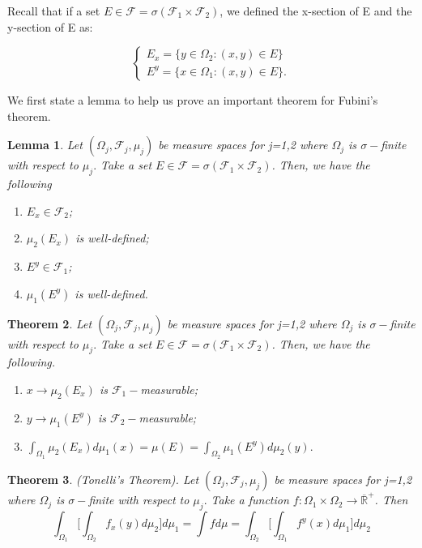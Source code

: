 \documentclass[twoside]{article}
\newcounter{lecnum}
\newtheorem{theorem}{Theorem}[lecnum]
\newtheorem{lemma}[theorem]{Lemma}
\newcommand{\sigmalgebra}{\mathcal{F}}
\newcommand{\positiveextendedreal}{\overline{\mathbb{R}}^+}
\begin{document}
Recall that if a set $E \in \sigmalgebra = \sigma(\sigmalgebra_1 \times \sigmalgebra_2)$, we defined the x-section of E and the y-section of E as: 

$$
\begin{cases}
E_x = \{y \in \Omega_2: (x,y) \in E\}\\
E^y = \{x \in \Omega_1: (x,y) \in E\}. 
\end{cases}
$$

We first state a lemma to help us prove an important theorem for Fubini's theorem.
\begin{lemma}Let $(\Omega_j, \sigmalgebra_j, \mu_j)$ be measure spaces for j=1,2 where $\Omega_j$ is $\sigma-$finite with respect to $\mu_j.$ Take a set $E \in \sigmalgebra = \sigma(\sigmalgebra_1 \times \sigmalgebra_2)$. Then, we have the following 
\begin{enumerate}
\item $E_x \in \sigmalgebra_2$;
\item $\mu_2(E_x)$ is well-defined;
\item $E^y \in \sigmalgebra_1$;
\item $\mu_1(E^y)$ is well-defined.
\end{enumerate}
\end{lemma}

\begin{theorem}Let $(\Omega_j, \sigmalgebra_j, \mu_j)$ be measure spaces for j=1,2 where $\Omega_j$ is $\sigma-$finite with respect to $\mu_j.$ Take a set $E \in \sigmalgebra = \sigma(\sigmalgebra_1 \times \sigmalgebra_2)$. Then, we have the following.
\begin{enumerate}
\item $x \rightarrow \mu_2(E_x)$ is $\sigmalgebra_1-$measurable;
\item $y \rightarrow \mu_1(E^y)$ is $\sigmalgebra_2-$measurable;
\item $\int_{\Omega_{1}} \mu_2(E_x)d\mu_1(x) = \mu(E) = \int_{\Omega_{2}} \mu_1(E^y)d\mu_2(y).$
\end{enumerate}
\end{theorem}


\begin{theorem}(Tonelli's Theorem). Let $(\Omega_j, \sigmalgebra_j, \mu_j)$ be measure spaces for j=1,2 where $\Omega_j$ is $\sigma-$finite with respect to $\mu_j.$ Take a function $f: \Omega_1 \times \Omega_2 \rightarrow \positiveextendedreal$. Then 
$$
\int_{\Omega_{1}}\bigg[\int_{\Omega_{2}}f_x(y)d\mu_2 \bigg]d\mu_1 = \int fd\mu = \int_{\Omega_{2}}\bigg[\int_{\Omega_{1}}f^y(x)d\mu_1 \bigg]d\mu_2
$$
\end{theorem}
\end{document}
